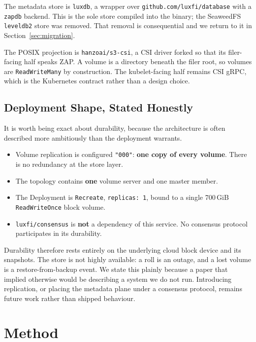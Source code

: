 \documentclass[11pt]{article}
\begin{document}
The metadata store is \texttt{luxdb}, a wrapper over
\texttt{github.com/luxfi/database} with a \texttt{zapdb} backend. This is the
sole store compiled into the binary; the SeaweedFS \texttt{leveldb2} store was
removed. That removal is consequential and we return to it in
Section~\ref{sec:migration}.

The POSIX projection is \texttt{hanzoai/s3-csi}, a CSI driver forked so that
its filer-facing half speaks ZAP. A volume is a directory beneath the filer
root, so volumes are \texttt{ReadWriteMany} by construction. The
kubelet-facing half remains CSI gRPC, which is the Kubernetes contract rather
than a design choice.

\subsection{Deployment Shape, Stated Honestly}
\label{sec:durability}

It is worth being exact about durability, because the architecture is often
described more ambitiously than the deployment warrants.

\begin{itemize}
  \item Volume replication is configured \texttt{"000"}: \textbf{one copy of
        every volume}. There is no redundancy at the store layer.
  \item The topology contains \textbf{one} volume server and one master
        member.
  \item The Deployment is \texttt{Recreate}, \texttt{replicas: 1}, bound to a
        single 700\,GiB \texttt{ReadWriteOnce} block volume.
  \item \texttt{luxfi/consensus} is \textbf{not} a dependency of this
        service. No consensus protocol participates in its durability.
\end{itemize}

Durability therefore rests entirely on the underlying cloud block device and
its snapshots. The store is not highly available: a roll is an outage, and a
lost volume is a restore-from-backup event. We state this plainly because a
paper that implied otherwise would be describing a system we do not run.
Introducing replication, or placing the metadata plane under a consensus
protocol, remains future work rather than shipped behaviour.

\section{Method}
\end{document}
